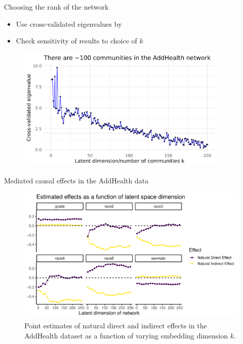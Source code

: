 \documentclass{beamer}
\theoremstyle{remark}
\begin{document}
\begin{frame}{Choosing the rank of the network}

    \begin{itemize}
        \item Use cross-validated eigenvalues by \cite{chen_estimating_2021}
        \item Check sensitivity of results to choice of $k$
    \end{itemize}

    \begin{figure}
        \includegraphics[width=0.9\textwidth]{figures/presentation/rank.png}
        \label{fig:rank}
    \end{figure}

\end{frame}

\begin{frame}{Mediated causal effects in the AddHealth data}

    \begin{figure}
        \includegraphics[width=\textwidth]{figures/addhealth-effects.pdf}
        \caption{Point estimates of natural direct and indirect effects in the AddHealth dataset as a function of varying embedding dimension $k$.}
        \label{fig:addhealth-estimates}
    \end{figure}
\end{frame}
\end{document}
